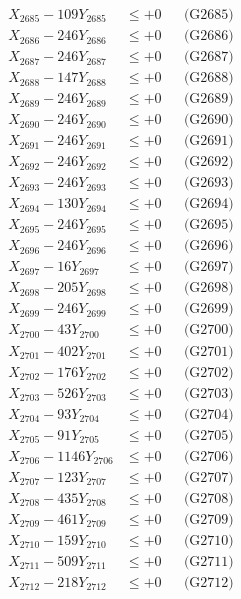\documentclass[a4paper,10pt]{article}
\begin{document}
{\begin{align}
X_{2685} - 109Y_{2685} &\leq +0 && \text{(G2685)} \\
X_{2686} - 246Y_{2686} &\leq +0 && \text{(G2686)} \\
X_{2687} - 246Y_{2687} &\leq +0 && \text{(G2687)} \\
X_{2688} - 147Y_{2688} &\leq +0 && \text{(G2688)} \\
X_{2689} - 246Y_{2689} &\leq +0 && \text{(G2689)} \\
X_{2690} - 246Y_{2690} &\leq +0 && \text{(G2690)} \\
\allowbreak
X_{2691} - 246Y_{2691} &\leq +0 && \text{(G2691)} \\
X_{2692} - 246Y_{2692} &\leq +0 && \text{(G2692)} \\
X_{2693} - 246Y_{2693} &\leq +0 && \text{(G2693)} \\
X_{2694} - 130Y_{2694} &\leq +0 && \text{(G2694)} \\
X_{2695} - 246Y_{2695} &\leq +0 && \text{(G2695)} \\
X_{2696} - 246Y_{2696} &\leq +0 && \text{(G2696)} \\
X_{2697} - 16Y_{2697} &\leq +0 && \text{(G2697)} \\
X_{2698} - 205Y_{2698} &\leq +0 && \text{(G2698)} \\
X_{2699} - 246Y_{2699} &\leq +0 && \text{(G2699)} \\
X_{2700} - 43Y_{2700} &\leq +0 && \text{(G2700)} \\
\allowbreak
X_{2701} - 402Y_{2701} &\leq +0 && \text{(G2701)} \\
X_{2702} - 176Y_{2702} &\leq +0 && \text{(G2702)} \\
X_{2703} - 526Y_{2703} &\leq +0 && \text{(G2703)} \\
X_{2704} - 93Y_{2704} &\leq +0 && \text{(G2704)} \\
X_{2705} - 91Y_{2705} &\leq +0 && \text{(G2705)} \\
X_{2706} - 1146Y_{2706} &\leq +0 && \text{(G2706)} \\
X_{2707} - 123Y_{2707} &\leq +0 && \text{(G2707)} \\
X_{2708} - 435Y_{2708} &\leq +0 && \text{(G2708)} \\
X_{2709} - 461Y_{2709} &\leq +0 && \text{(G2709)} \\
X_{2710} - 159Y_{2710} &\leq +0 && \text{(G2710)} \\
\allowbreak
X_{2711} - 509Y_{2711} &\leq +0 && \text{(G2711)} \\
X_{2712} - 218Y_{2712} &\leq +0 && \text{(G2712)} \\

\end{align}}
\end{document}
